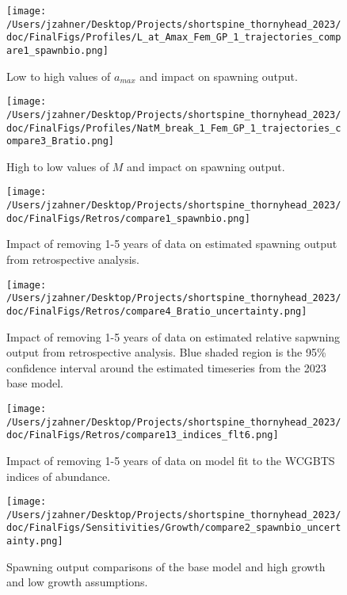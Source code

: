 \documentclass[11pt,
  english,
  letterpaper,
]{article}
\begin{document}
\begin{figure}
\centering
\texttt{[image: /Users/jzahner/Desktop/Projects/shortspine\_thornyhead\_2023/doc/FinalFigs/Profiles/L\_at\_Amax\_Fem\_GP\_1\_trajectories\_compare1\_spawnbio.png]}
\caption{Low to high values of \(a_{max}\) and impact on spawning output.\label{fig:growth_spawnout}}
\end{figure}

\begin{figure}
\centering
\texttt{[image: /Users/jzahner/Desktop/Projects/shortspine\_thornyhead\_2023/doc/FinalFigs/Profiles/NatM\_break\_1\_Fem\_GP\_1\_trajectories\_compare3\_Bratio.png]}
\caption{High to low values of \(M\) and impact on spawning output.\label{fig:M_spawnout}}
\end{figure}

\clearpage

\begin{figure}
\centering
\texttt{[image: /Users/jzahner/Desktop/Projects/shortspine\_thornyhead\_2023/doc/FinalFigs/Retros/compare1\_spawnbio.png]}
\caption{Impact of removing 1-5 years of data on estimated spawning output from retrospective analysis.\label{fig:retros_spawnbio}}
\end{figure}

\begin{figure}
\centering
\texttt{[image: /Users/jzahner/Desktop/Projects/shortspine\_thornyhead\_2023/doc/FinalFigs/Retros/compare4\_Bratio\_uncertainty.png]}
\caption{Impact of removing 1-5 years of data on estimated relative sapwning output from retrospective analysis. Blue shaded region is the 95\% confidence interval around the estimated timeseries from the 2023 base model.\label{fig:retros_bratio_uncertainty}}
\end{figure}

\begin{figure}
\centering
\texttt{[image: /Users/jzahner/Desktop/Projects/shortspine\_thornyhead\_2023/doc/FinalFigs/Retros/compare13\_indices\_flt6.png]}
\caption{Impact of removing 1-5 years of data on model fit to the WCGBTS indices of abundance.\label{fig:retros_indices}}
\end{figure}

\begin{figure}
\centering
\texttt{[image: /Users/jzahner/Desktop/Projects/shortspine\_thornyhead\_2023/doc/FinalFigs/Sensitivities/Growth/compare2\_spawnbio\_uncertainty.png]}
\caption{Spawning output comparisons of the base model and high growth and low growth assumptions.\label{fig:growth_sensitiv_spawning}}
\end{figure}
\end{document}
